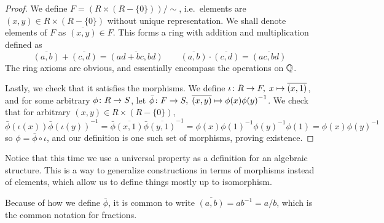 \begin{proof}
    We define \(F = (R \times (R - \{0\}))/{\sim}\),
    i.e.\ elements are \((x,y) \in R \times (R - \{0\})\)
    without unique representation.
    We shall denote elements of \(F\) as \(\overline{(x,y)} \in F\).
    This forms a ring with addition and multiplication defined as
    \begin{equation*}
        \overline{(a,b)} + \overline{(c,d)} = \overline{(ad+bc,bd)} \qquad
        \overline{(a,b)} \cdot \overline{(c,d)} = \overline{(ac,bd)}
    \end{equation*}
    The ring axioms are obvious,
    and essentially encompass the operations on \(\mathbb{Q}\).

    Lastly, we check that it satisfies the morphisms.
    We define \(\iota\colon R\to F,\;x\mapsto\overline{(x,1)}\),
    and for some arbitrary \(\phi\colon R\to S\),
    let \(\bar{\phi}\colon F\to S,\;\overline{(x,y)}\mapsto\phi(x){\phi(y)}^{-1}\).
    We check that for arbitrary \((x,y) \in R \times (R - \{0\})\),
    \begin{equation*}
        \bar{\phi}(\iota(x)){\bar{\phi}(\iota(y))}^{-1}
        = \bar{\phi}\overline{(x,1)}{\bar{\phi}\overline{(y,1)}}^{-1}
        = \phi(x){\phi(1)}^{-1}{\phi(y)}^{-1}\phi(1)
        = \phi(x){\phi(y)}^{-1}
    \end{equation*}
    so \(\phi = \bar{\phi}\circ\iota\),
    and our definition is one such set of morphisms, proving existence.
\end{proof}
\begin{remark}
    Notice that this time we use a universal property
    as a definition for an algebraic structure.
    This is a way to generalize constructions
    in terms of morphisms instead of elements,
    which allow us to define things mostly up to isomorphism.
\end{remark}
\begin{remark}
    Because of how we define \(\bar{\phi}\),
    it is common to write \(\overline{(a,b)} = ab^{-1} = a/b\),
    which is the common notation for fractions.
\end{remark}


